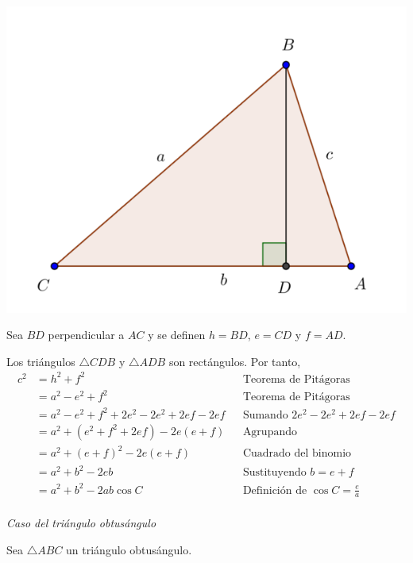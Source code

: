 \documentclass[11pt]{article}
\begin{document}
\begin{itemize}
\begin{demostracion}
\begin{center}
\includegraphics[width=.9\linewidth]{./fig/teorema-coseno.2.png}
\end{center}

Sea \(BD\) perpendicular a \(AC\) y se definen \(h = BD\), \(e = CD\) y \(f = AD\).

Los triángulos \(\triangle CDB\) y \(\triangle ADB\) son rectángulos. Por tanto, \\
\begin{align*}
c^2 &= h^2 + f^2
    && \text{Teorema de Pitágoras} \\
    &= a^2 - e^2 + f^2
    && \text{Teorema de Pitágoras} \\
    &= a^2 - e^2 + f^2 + 2e^2 - 2e^2 + 2ef - 2ef
    && \text{Sumando $2e^2 - 2e^2 + 2ef - 2ef$} \\
    &= a^2 + (e^2 + f^2 + 2ef) - 2e(e + f)
    && \text{Agrupando} \\
    &= a^2 + (e + f)^2 - 2e(e+f)
    && \text{Cuadrado del binomio} \\
    &= a^2 + b^2 - 2eb
    && \text{Sustituyendo $b = e + f$} \\
    &= a^2 + b^2 - 2 a b \cos C
    && \text{Definición de $\cos C = \frac{e}{a}$} \\
\end{align*}

\emph{Caso del triángulo obtusángulo}

Sea \(\triangle ABC\) un triángulo obtusángulo.


\end{demostracion}
\end{itemize}
\end{document}
